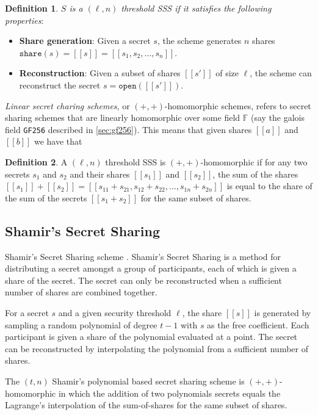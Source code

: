 \documentclass[twoside,11pt,openright]{report}
\theoremstyle{definition}
\newtheorem{definition}{Definition}[section]
\theoremstyle{plain}
\begin{document}
\begin{definition}
  \label{def:sss}
  \textit{$S$ is a $(\ell,n)$ threshold SSS if it satisfies the following properties}:

  \begin{itemize}
    \item \textbf{Share generation}: Given a secret $s$, the scheme generates $n$ shares $\texttt{share}(s) = [[s]] = [[s_1, s_2, \dots, s_n]]$.
    \item \textbf{Reconstruction}: Given a subset of shares $[[s']]$ of size $\ell$, the scheme can reconstruct the secret $s = \texttt{open}([[s']])$.
  \end{itemize}

\end{definition}

\textit{Linear secret charing schemes}, or $(+,+)$-homomorphic schemes, refers to secret sharing schemes that are linearly homomorphic over some field $\mathbb{F}$ (say the galois field \texttt{GF256} described in \autoref{sec:gf256}). This means that given shares $[[a]]$ and $[[b]]$ we have that
\begin{definition}
  A $(\ell,n)$ threshold SSS is $(+,+)$-homomorphic if for any two secrets $s_1$ and $s_2$ and their shares $[[s_1]]$ and $[[s_2]]$, the sum of the shares $[[s_1]] + [[s_2]] = [[s_{11} + s_{21}, s_{12} + s_{22}, \dots, s_{1n} + s_{2n}]]$ is equal to the share of the sum of the secrets $[[s_1 + s_2]]$ for the same subset of shares.
\end{definition}

\subsection{Shamir's Secret Sharing}\label{sec:shamir}

Shamir's Secret Sharing scheme \cite{shamir1979share}. Shamir's Secret Sharing is a method for distributing a secret amongst a group of participants, each of which is given a share of the secret. The secret can only be reconstructed when a sufficient number of shares are combined together.

For a secret $s$ and a given security threshold $\ell$, the share $[[s]]$ is generated by sampling a random polynomial of degree $t-1$ with $s$ as the free coefficient. Each participant is given a share of the polynomial evaluated at a point. The secret can be reconstructed by interpolating the polynomial from a sufficient number of shares.

The $(t,n)$ Shamir's polynomial based secret sharing scheme is $(+,+)$-homomorphic in which the addition of two polynomials secrets equals the Lagrange's interpolation of the sum-of-shares for the same subset of shares.
\end{document}

